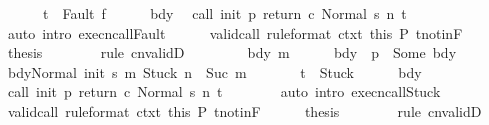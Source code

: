 \begin{isabellebody}
\ \ \ \ \ \ {\isachardoublequoteopen}t\ {\isacharequal}\ Fault\ f{\isachardoublequoteclose}\isanewline
\ \ \ \ \isamarkupfalse%
\ bdy\ \isamarkupfalse%
\ {\isachardoublequoteopen}{\isasymGamma}{\isasymturnstile}{\isasymlangle}call\ init\ p\ return{\isacharprime}\ c\ {\isacharcomma}Normal\ s{\isasymrangle}\ {\isacharequal}n{\isasymRightarrow}\ t{\isachardoublequoteclose}\isanewline
\ \ \ \ \ \ \isamarkupfalse%
\ {\isacharparenleft}auto\ intro{\isacharcolon}\ execn{\isacharunderscore}callFault{\isacharparenright}\isanewline
\ \ \ \ \isamarkupfalse%
\ valid{\isacharunderscore}call\ {\isacharbrackleft}rule{\isacharunderscore}format{\isacharbrackright}\ ctxt\ this\ P\ t{\isacharunderscore}notin{\isacharunderscore}F\isanewline
\ \ \ \ \isamarkupfalse%
\ {\isacharquery}thesis\isanewline
\ \ \ \ \ \ \isamarkupfalse%
\ {\isacharparenleft}rule\ cnvalidD{\isacharparenright}\isanewline
\ \ \isamarkupfalse%
\isanewline
\ \ \ \ \isamarkupfalse%
\ bdy\ m\isanewline
\ \ \ \ \isamarkupfalse%
\ bdy{\isacharcolon}\ {\isachardoublequoteopen}{\isasymGamma}\ p\ {\isacharequal}\ Some\ bdy{\isachardoublequoteclose}\isanewline
\ \ \ \ \isamarkupfalse%
\ {\isachardoublequoteopen}{\isasymGamma}{\isasymturnstile}{\isasymlangle}bdy{\isacharcomma}Normal\ {\isacharparenleft}init\ s{\isacharparenright}{\isasymrangle}\ {\isacharequal}m{\isasymRightarrow}\ Stuck{\isachardoublequoteclose}\ {\isachardoublequoteopen}n\ {\isacharequal}\ Suc\ m{\isachardoublequoteclose}\ \isanewline
\ \ \ \ \ \ {\isachardoublequoteopen}t\ {\isacharequal}\ Stuck{\isachardoublequoteclose}\isanewline
\ \ \ \ \isamarkupfalse%
\ bdy\ \isamarkupfalse%
\ {\isachardoublequoteopen}{\isasymGamma}{\isasymturnstile}{\isasymlangle}call\ init\ p\ return{\isacharprime}\ c\ {\isacharcomma}Normal\ s{\isasymrangle}\ {\isacharequal}n{\isasymRightarrow}\ t{\isachardoublequoteclose}\isanewline
\ \ \ \ \ \ \isamarkupfalse%
\ {\isacharparenleft}auto\ intro{\isacharcolon}\ execn{\isacharunderscore}callStuck{\isacharparenright}\isanewline
\ \ \ \ \isamarkupfalse%
\ valid{\isacharunderscore}call\ {\isacharbrackleft}rule{\isacharunderscore}format{\isacharbrackright}\ ctxt\ this\ P\ t{\isacharunderscore}notin{\isacharunderscore}F\isanewline
\ \ \ \ \isamarkupfalse%
\ {\isacharquery}thesis\isanewline
\ \ \ \ \ \ \isamarkupfalse%
\ {\isacharparenleft}rule\ cnvalidD{\isacharparenright}\isanewline

\end{isabellebody}

